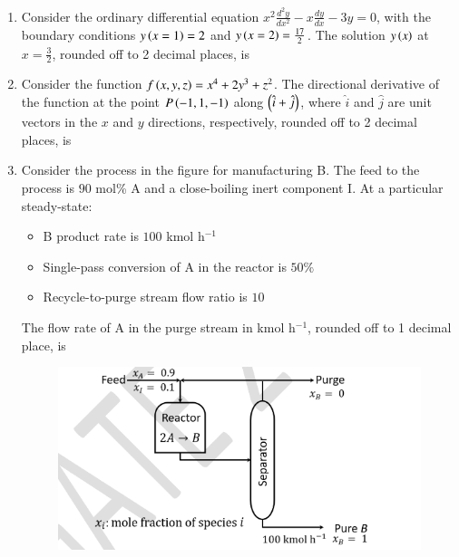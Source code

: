\documentclass[journal,12pt,onecolumn]{IEEEtran}
\theoremstyle{remark}
\begin{document}
\begin{enumerate}
	\hfill{}
	
	\item Consider the ordinary differential equation $x^2 \frac{d^2y}{dx^2} - x\frac{dy}{dx} - 3y = 0$, with the boundary conditions $y\left(x=1\right)=2$ and $y\left(x=2\right)=\frac{17}{2}$. The solution $y\left(x\right)$ at $x=\frac{3}{2}$, rounded off to 2 decimal places, is \underline{\hspace{2cm}}
	
	\hfill{}
	
	\item Consider the function $f\left(x, y, z\right) = x^4 + 2y^3 + z^2$. The directional derivative of the function at the point $P\left(-1, 1, -1\right)$ along $\left(\hat{i}+\hat{j}\right)$, where $\hat{i}$ and $\hat{j}$ are unit vectors in the $x$ and $y$ directions, respectively, rounded off to 2 decimal places, is \underline{\hspace{2cm}}
	
	\hfill{}
	
	\item Consider the process in the figure for manufacturing B. The feed to the process is $90$ mol\% A and a close-boiling inert component I. At a particular steady-state:
	\begin{itemize}
		\item B product rate is $100$ kmol h$^{-1}$
		\item Single-pass conversion of A in the reactor is $50\%$
		\item Recycle-to-purge stream flow ratio is $10$
	\end{itemize}
	The flow rate of A in the purge stream in kmol h$^{-1}$, rounded off to 1 decimal place, is \underline{\hspace{2cm}}
	\begin{figure}
		\includegraphics[width = 0.8\columnwidth]{q54}
		\caption*{}
		\label{fig:q54}
	\end{figure}
	

\end{enumerate}
\end{document}
